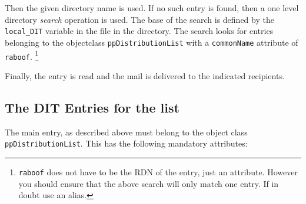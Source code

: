 Then the given directory name is used.  If no such entry is found, then a 
one level directory {\em search} operation is used.  The base of the
search is defined by the \verb+local_DIT+ variable in the
 file in the  directory.
The search looks for entries belonging to the objectclass
\verb|ppDistributionList|
with a \verb+commonName+ attribute of \verb+raboof+.
\footnote{\verb+raboof+ does not have to be the RDN of the entry, just an
attribute. However you should ensure that the above search will only
match one entry.  If in doubt use an alias.}

Finally, the entry is read and the mail is delivered to the indicated
recipients.

\subsection{The DIT Entries for the list}

The main entry, as described above must belong to the object class
\verb+ppDistributionList+.  This has the following mandatory
attributes:

